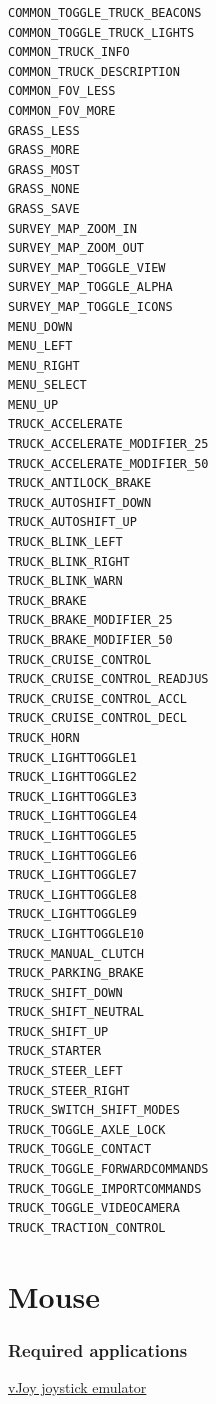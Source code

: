 \begin{verbatim}
COMMON_TOGGLE_TRUCK_BEACONS 
COMMON_TOGGLE_TRUCK_LIGHTS  
COMMON_TRUCK_INFO           
COMMON_TRUCK_DESCRIPTION    
COMMON_FOV_LESS             
COMMON_FOV_MORE             
GRASS_LESS                  
GRASS_MORE                  
GRASS_MOST                  
GRASS_NONE                  
GRASS_SAVE                  
SURVEY_MAP_ZOOM_IN          
SURVEY_MAP_ZOOM_OUT         
SURVEY_MAP_TOGGLE_VIEW      
SURVEY_MAP_TOGGLE_ALPHA     
SURVEY_MAP_TOGGLE_ICONS     
MENU_DOWN                   
MENU_LEFT                   
MENU_RIGHT                  
MENU_SELECT                 
MENU_UP                     
TRUCK_ACCELERATE            
TRUCK_ACCELERATE_MODIFIER_25
TRUCK_ACCELERATE_MODIFIER_50
TRUCK_ANTILOCK_BRAKE        
TRUCK_AUTOSHIFT_DOWN        
TRUCK_AUTOSHIFT_UP          
TRUCK_BLINK_LEFT            
TRUCK_BLINK_RIGHT           
TRUCK_BLINK_WARN            
TRUCK_BRAKE                 
TRUCK_BRAKE_MODIFIER_25     
TRUCK_BRAKE_MODIFIER_50     
TRUCK_CRUISE_CONTROL        
TRUCK_CRUISE_CONTROL_READJUS
TRUCK_CRUISE_CONTROL_ACCL   
TRUCK_CRUISE_CONTROL_DECL   
TRUCK_HORN                  
TRUCK_LIGHTTOGGLE1          
TRUCK_LIGHTTOGGLE2          
TRUCK_LIGHTTOGGLE3          
TRUCK_LIGHTTOGGLE4          
TRUCK_LIGHTTOGGLE5          
TRUCK_LIGHTTOGGLE6          
TRUCK_LIGHTTOGGLE7          
TRUCK_LIGHTTOGGLE8          
TRUCK_LIGHTTOGGLE9          
TRUCK_LIGHTTOGGLE10         
TRUCK_MANUAL_CLUTCH         
TRUCK_PARKING_BRAKE         
TRUCK_SHIFT_DOWN            
TRUCK_SHIFT_NEUTRAL         
TRUCK_SHIFT_UP              
TRUCK_STARTER               
TRUCK_STEER_LEFT            
TRUCK_STEER_RIGHT           
TRUCK_SWITCH_SHIFT_MODES    
TRUCK_TOGGLE_AXLE_LOCK      
TRUCK_TOGGLE_CONTACT        
TRUCK_TOGGLE_FORWARDCOMMANDS
TRUCK_TOGGLE_IMPORTCOMMANDS 
TRUCK_TOGGLE_VIDEOCAMERA    
TRUCK_TRACTION_CONTROL      
\end{verbatim}

\hypertarget{mouse}{%
\section{Mouse}\label{mouse}}

\hypertarget{required-applications}{%
\subsubsection{Required applications}\label{required-applications}}

\href{http://vjoystick.sourceforge.net/site/index.php/download-a-install/72-download}{vJoy
joystick emulator}

